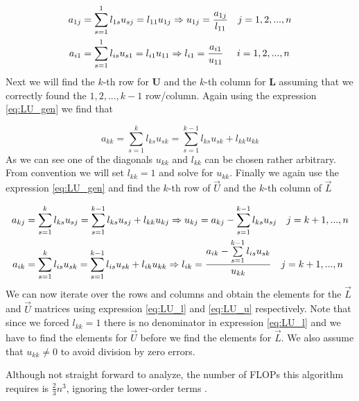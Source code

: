 \documentclass[english]{article}
\renewcommand{\vec}{\mathbf} %
\begin{document}
\begin{align*}
    a_{1j} &= \sum_{s=1}^{1} l_{1s} u_{sj} = l_{11} u_{1j} \Rightarrow u_{1j} = \frac{a_{1j}}{l_{11}} \hspace{10px} j = 1, 2, ... , n \\
    a_{i1} &= \sum_{s=1}^{1} l_{is}u_{s1} = l_{i1}u_{11} \Rightarrow l_{i1} = \frac{a_{i1}}{u_{11}} \hspace{14px} i = 1, 2, ... , n
\end{align*}
Next we will find the $k$-th row for $\vec{U}$ and the $k$-th column for $\vec{L}$ assuming that we correctly found the $1, 2, ... , k-1$ row/column. Again using the expression \ref{eq:LU_gen} we find that

\begin{equation*}
    a_{kk} = \sum_{s=1}^{k} l_{ks}u_{sk} = \sum_{s=1}^{k-1} l_{ks}u_{sk} + l_{kk}u_{kk}
\end{equation*}
As we can see one of the diagonals $u_{kk}$ and $l_{kk}$ can be chosen rather arbitrary. From convention we will set $l_{kk} = 1$ and solve for $u_{kk}$. Finally we again use the expression \ref{eq:LU_gen} and find the $k$-th row of $\Vec{U}$ and the $k$-th column of $\Vec{L}$

\begin{align}
        a_{kj} &= \sum_{s=1}^{k} l_{ks}u_{sj} = \sum_{s=1}^{k-1} l_{ks}u_{sj} + l_{kk}u_{kj} \Rightarrow u_{kj} = a_{kj}- \sum_{s=1}^{k-1} l_{ks}u_{sj} \hspace{10px} j = k+1, ... , n \label{eq:LU_u}\\
        a_{ik} &= \sum_{s=1}^{k} l_{is}u_{sk} = \sum_{s=1}^{k-1} l_{is}u_{sk} + l_{ik}u_{kk} \Rightarrow  l_{ik} = \frac{a_{ik}-\sum\limits_{s=1}^{k-1} l_{is}u_{sk}}{u_{kk}} \hspace{10px} j = k+1, ... , n \label{eq:LU_l}
\end{align}
We can now iterate over the rows and columns and obtain the elements for the $\Vec{L}$ and $\Vec{U}$ matrices using expression \ref{eq:LU_l} and \ref{eq:LU_u} respectively. Note that since we forced $l_{kk} = 1$ there is no denominator in expression \ref{eq:LU_l} and we have to find the elements for $\Vec{U}$ before we find the elements for $\Vec{L}$. We also assume that $u_{kk} \neq 0$ to avoid division by zero errors. 


Although not straight forward to analyze, the number of FLOPs this algorithm requires is $\frac{2}{3}n^3$, ignoring the lower-order terms \autocite{LU_decomp}.
\end{document}
